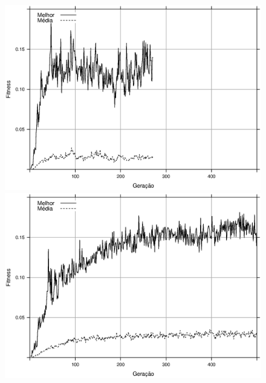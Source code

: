 \begin{figure}[h]
    \centering
    \begin{minipage}{.5\textwidth}
        \includegraphics[width=\textwidth]{figures/fitness-GA}
    \end{minipage}%
    \begin{minipage}{.5\textwidth}
        \includegraphics[width=\textwidth]{figures/fitness-PGA}
    \end{minipage}


\end{figure}
